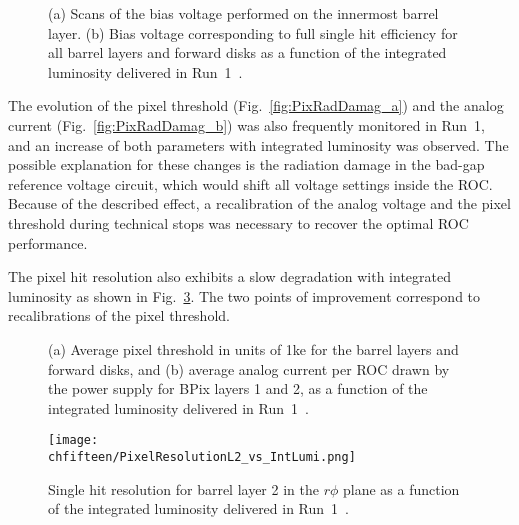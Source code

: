\begin{figure}[!htb]
 \begin{center}
 \end{center}
 \caption{(a) Scans of the bias voltage performed on the innermost barrel layer. (b) Bias voltage corresponding to full single hit efficiency for all barrel layers and forward disks as a function of the integrated luminosity delivered in Run~1~\cite{PixelOffline}.}
 \label{fig:PixBiasV}
\end{figure}

The evolution of the pixel threshold (Fig.~\ref{fig:PixRadDamag_a}) and the analog current (Fig.~\ref{fig:PixRadDamag_b}) was also frequently monitored in Run~1,
and an increase of both parameters with integrated luminosity was observed.
The possible explanation for these changes is the radiation damage in the bad-gap reference voltage circuit, which would shift all voltage settings inside the ROC.
Because of the described effect, a recalibration of the analog voltage and the pixel threshold during technical stops was necessary to recover the optimal ROC performance.

The pixel hit resolution also exhibits a slow degradation with integrated luminosity as shown in Fig.~\ref{fig:PixRelvsLumi}. The two points of improvement correspond to recalibrations of the pixel threshold.

\begin{figure}[!htb]
 \begin{center}
 \end{center}
 \caption{(a) Average pixel threshold in units of 1\unit{ke} for the barrel layers and forward disks, and (b) average analog current per ROC drawn by the power supply for BPix layers 1 and 2, as a function of the integrated luminosity delivered in Run~1~\cite{PixelOffline}.}
 \label{fig:PixRadDamag}
\end{figure}

\begin{figure}[!htb]
 \begin{center}
 \texttt{[image: \\chfifteen/PixelResolutionL2\_vs\_IntLumi.png]}
 \end{center}
 \caption{Single hit resolution for barrel layer 2 in the $r\phi$ plane as a function of the integrated luminosity delivered in Run~1~\cite{PixelOffline}.}
 \label{fig:PixRelvsLumi}
\end{figure}

